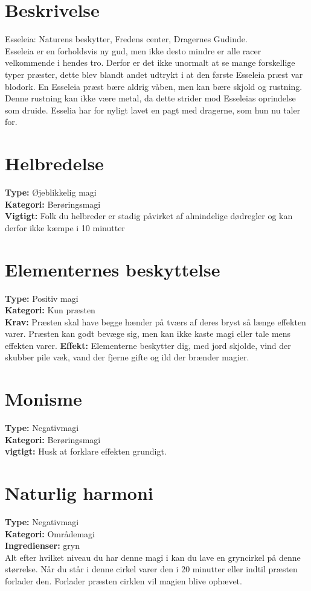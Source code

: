\section{Beskrivelse}
Esseleia: Naturens beskytter, Fredens center, Dragernes Gudinde.\\ Esseleia er en forholdsvis ny gud, men ikke desto mindre er alle racer velkommende i hendes tro. Derfor er det ikke unormalt at se mange forskellige typer præster, dette blev blandt andet udtrykt i at den første Esseleia præst var blodork. En Esseleia præst bære aldrig våben, men kan bære skjold og rustning. Denne rustning kan ikke være metal, da dette strider mod Esseleias oprindelse som druide. Esselia har for nyligt lavet en pagt med dragerne, som hun nu taler for.

\section{Helbredelse}
\textbf{Type:} Øjeblikkelig magi \\
\textbf{Kategori:} Berøringsmagi\\
\textbf{Vigtigt:} Folk du helbreder er stadig påvirket af almindelige dødregler og kan derfor ikke kæmpe i 10 minutter

\section{Elementernes beskyttelse}
\textbf{Type:} Positiv magi\\
\textbf{Kategori:} Kun præsten\\
\textbf{Krav:} Præsten skal have begge hænder på tværs af deres bryst så længe effekten varer. Præsten kan godt bevæge sig, men kan ikke kaste magi eller tale mens effekten varer.
\textbf{Effekt:} Elementerne beskytter dig, med jord skjolde, vind der skubber pile væk, vand der fjerne gifte og ild der brænder magier.

\section{Monisme}
\textbf{Type:} Negativmagi\\
\textbf{Kategori:} Berøringsmagi\\
\textbf{vigtigt:} Husk at forklare effekten grundigt.


\section{Naturlig harmoni}
\textbf{Type:} Negativmagi\\
\textbf{Kategori:} Områdemagi\\
\textbf{Ingredienser:} gryn\\
Alt efter hvilket niveau du har denne magi i kan du lave en gryncirkel på denne størrelse. Når du står i denne cirkel varer den i 20 minutter eller indtil præsten forlader den. Forlader præsten cirklen vil magien blive ophævet.
